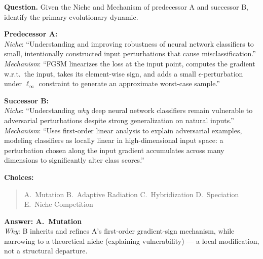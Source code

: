 \begin{tcolorbox}[
    breakable,
    title={Example of T3 · Evolutionary Dynamics (T3-01: Single-Step Dynamics)},
    colback=LighterGray,
    colframe=DeepPurple,
    colbacktitle=DeepPurple,
    coltitle=White,
]
\textbf{\textcolor{CaseOrange}{Question.}} Given the Niche and Mechanism of predecessor A and successor B, identify the primary evolutionary dynamic.

\smallskip
\textbf{Predecessor A:}\\
\textit{Niche}: ``Understanding and improving robustness of neural network classifiers to small, intentionally constructed input perturbations that cause misclassification.''\\
\textit{Mechanism}: ``FGSM linearizes the loss at the input point, computes the gradient w.r.t.\ the input, takes its element-wise sign, and adds a small $\epsilon$-perturbation under $\ell_\infty$ constraint to generate an approximate worst-case sample.''

\smallskip
\textbf{Successor B:}\\
\textit{Niche}: ``Understanding \emph{why} deep neural network classifiers remain vulnerable to adversarial perturbations despite strong generalization on natural inputs.''\\
\textit{Mechanism}: ``Uses first-order linear analysis to explain adversarial examples, modeling classifiers as locally linear in high-dimensional input space: a perturbation chosen along the input gradient accumulates across many dimensions to significantly alter class scores.''

\medskip
\textbf{\textcolor{CaseOrange}{Choices:}}
\begin{quote}\small
A.\ Mutation \quad B.\ Adaptive Radiation \quad C.\ Hybridization \quad D.\ Speciation \quad E.\ Niche Competition
\end{quote}

\textbf{\textcolor{CaseBlue}{Answer: A.\ Mutation}}\\
\textit{Why}: B inherits and refines A's first-order gradient-sign mechanism, while narrowing to a theoretical niche (explaining vulnerability) — a local modification, not a structural departure.
\end{tcolorbox}

\bigskip


